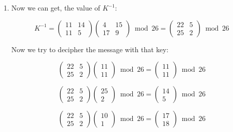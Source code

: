 \documentclass[titlepage, 12pt]{article}
\numberwithin{equation}{section}%
\numberwithin{figure}{section}%
\numberwithin{table}{section}%
\begin{document}
\begin{enumerate}
		\item Now we can get, the value of $K^{-1}$:
		
		\begin{equation}
			K^{-1} = 
			\begin{pmatrix}
			11 & 14 \\
			11 & 5
			\end{pmatrix}
			\begin{pmatrix}
			4 & 15 \\
			17 & 9
			\end{pmatrix}\bmod{26} = 
			\begin{pmatrix}
			22 & 5 \\
			25 & 2
			\end{pmatrix}\bmod{26}			
		\end{equation}
		
		Now we try to decipher the message with that key:
		
		\begin{equation*}
			\begin{pmatrix}
			22 & 5 \\
			25 & 2
			\end{pmatrix}
			\begin{pmatrix}
			11 \\
			11
			\end{pmatrix}\bmod{26} = 
			\begin{pmatrix}
			11 \\
			11
			\end{pmatrix}\bmod{26}
		\end{equation*}
		
		\begin{equation*}
			\begin{pmatrix}
			22 & 5 \\
			25 & 2
			\end{pmatrix}
			\begin{pmatrix}
			25 \\
			2
			\end{pmatrix}\bmod{26} = 
			\begin{pmatrix}
			14 \\
			5
			\end{pmatrix}\bmod{26}
		\end{equation*}
		
		\begin{equation*}
			\begin{pmatrix}
			22 & 5 \\
			25 & 2
			\end{pmatrix}
			\begin{pmatrix}
			10 \\
			1
			\end{pmatrix}\bmod{26} = 
			\begin{pmatrix}
			17 \\
			18
			\end{pmatrix}\bmod{26}
		\end{equation*}
		

\end{enumerate}
\end{document}
